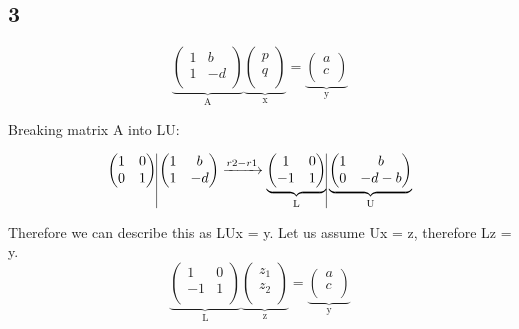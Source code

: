 \documentclass{article}
\begin{document}
\subsection*{3}
$$
\underbrace{ \begin{pmatrix}
1&b\\
1&-d\\
\end{pmatrix}}_\text{A}
\underbrace{\begin{pmatrix}
p\\
q\\
\end{pmatrix}}_\text{x}
=
\underbrace{\begin{pmatrix}
a\\
c\\
\end{pmatrix}}_\text{y}
$$

Breaking matrix A into LU:

$$
\begin{pmatrix}
1&0\\
0&1\\
\end{pmatrix}
\vline
\begin{pmatrix}
1&b\\
1&-d\\
\end{pmatrix}
\xrightarrow{r2 - r1}
\underbrace{\begin{pmatrix}
1&0\\
-1&1\\
\end{pmatrix}}_\text{L}
\vline
\underbrace{\begin{pmatrix}
1&b\\
0&-d - b\\
\end{pmatrix}}_\text{U}
$$

Therefore we can describe this as LUx = y. Let us assume Ux = z, therefore Lz = y.
$$
\underbrace{\begin{pmatrix}
1&0\\
-1&1\\
\end{pmatrix}}_\text{L}
\underbrace{\begin{pmatrix}
z_1\\
z_2\\
\end{pmatrix}}_\text{z}
=
\underbrace{\begin{pmatrix}
a\\
c\\
\end{pmatrix}}_\text{y}
$$
\end{document}
